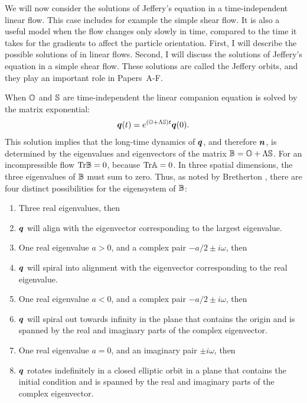 \documentclass[thesis.tex]{subfiles}
\begin{document}
We will now consider the solutions of Jeffery's equation in a time-independent linear flow. This case includes for example the simple shear flow. It is also a useful model when the flow changes only slowly in time, compared to the time it takes for the gradients to affect the particle orientation. First, I will describe the possible solutions of  in linear flows. Second, I will discuss the solutions of Jeffery's equation in a simple shear flow. These solutions are called the Jeffery orbits, and they play an important role in Papers~A-F.

When $\mathbb{O}$ and $\mathbb{S}$ are time-independent the linear companion equation  is solved by the matrix exponential:
\begin{align}
		\mbox{\boldmath$q$}(t) = e^{(\mathbb{O} + \Lambda \mathbb{S})t}\mbox{\boldmath$q$}(0).
\end{align}
This solution implies that the long-time dynamics of $\mbox{\boldmath$q$}$, and therefore $\mbox{\boldmath$n$}$, is determined by the eigenvalues and eigenvectors of the matrix $\mathbb{B} = \mathbb{O} + \Lambda\mathbb{S}$. For an incompressible flow $\mbox{Tr}\mathbb{B}=0$, because $\mbox{Tr}\mathbb{A}=0$. In three spatial dimensions, the three eigenvalues of $\mathbb{B}$ must sum to zero. Thus, as noted by Bretherton \cite{bretherton1962}, there are four distinct possibilities for the eigensystem of $\mathbb{B}$:
\begin{enumerate}
	\item Three real eigenvalues, then
	\item[] $\mbox{\boldmath$q$}$ will align with the eigenvector corresponding to the largest eigenvalue.
	\item One real eigenvalue $a>0$, and a complex pair $-a/2 \pm i\omega$, then
	\item[] $\mbox{\boldmath$q$}$ will spiral into alignment with the eigenvector corresponding to the real eigenvalue.
	\item One real eigenvalue $a<0$, and a complex pair $-a/2 \pm i\omega$, then
	\item[] $\mbox{\boldmath$q$}$ will spiral out towards infinity in the plane that contains the origin and is spanned by the real and imaginary parts of the complex eigenvector.
	\item One real eigenvalue $a=0$, and an imaginary pair $\pm i\omega$, then
	\item[] $\mbox{\boldmath$q$}$ rotates indefinitely in a closed elliptic orbit in a plane that contains the initial condition and is spanned by the real and imaginary parts of the complex eigenvector.
\end{enumerate}
\end{document}
